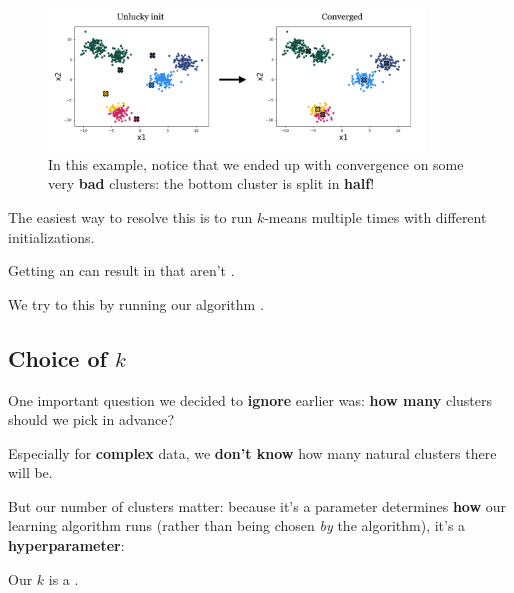         \begin{figure}[H]
            \centering
            \includegraphics[width=100mm,scale=0.4]{images/clustering_images/unlucky_init.png}
            \caption*{In this example, notice that we ended up with convergence on some very \textbf{bad} clusters: the bottom cluster is split in \textbf{half}!}
        \end{figure}
        
        The easiest way to resolve this is to run $k$-means multiple times with different initializations.
            \\
        
        \begin{concept}
            Getting an  can result in  that aren't .
            
            We try to  this by running our algorithm .
        \end{concept}
        
        
    \subsection{Choice of $k$}
    
        One important question we decided to \textbf{ignore} earlier was: \textbf{how many} clusters should we pick in advance?
        
        Especially for \textbf{complex} data, we \textbf{don't know} how many natural clusters there will be. 
        
        But our number of clusters matter: because it's a parameter determines \textbf{how} our learning algorithm runs (rather than being chosen \textit{by} the algorithm), it's a \textbf{hyperparameter}:\\
        
        \begin{concept}
            Our  $k$ is a .
        \end{concept}
        

